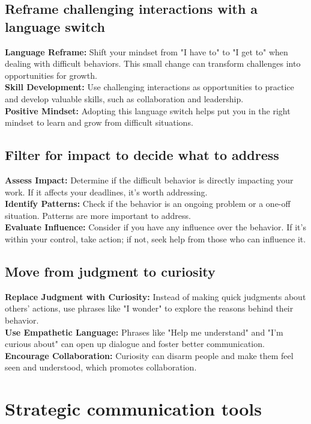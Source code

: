 \documentclass[12pt]{article}
\begin{document}
\subsection{Reframe challenging interactions with a language switch}
\textbf{Language Reframe:}  Shift your mindset from "I have to" to "I get to" when dealing with difficult behaviors. This small change can transform challenges into opportunities for growth.\\
\textbf{Skill Development:}  Use challenging interactions as opportunities to practice and develop valuable skills, such as collaboration and leadership.\\
\textbf{Positive Mindset:}  Adopting this language switch helps put you in the right mindset to learn and grow from difficult situations.

\subsection{Filter for impact to decide what to address}
\textbf{Assess Impact:}  Determine if the difficult behavior is directly impacting your work. If it affects your deadlines, it's worth addressing.\\
\textbf{Identify Patterns:}  Check if the behavior is an ongoing problem or a one-off situation. Patterns are more important to address.\\
\textbf{Evaluate Influence:}  Consider if you have any influence over the behavior. If it's within your control, take action; if not, seek help from those who can influence it.

\subsection{Move from judgment to curiosity}
\textbf{Replace Judgment with Curiosity:}  Instead of making quick judgments about others' actions, use phrases like "I wonder" to explore the reasons behind their behavior.\\
\textbf{Use Empathetic Language:} Phrases like "Help me understand" and "I'm curious about" can open up dialogue and foster better communication.\\
\textbf{Encourage Collaboration:} Curiosity can disarm people and make them feel seen and understood, which promotes collaboration.

\section{Strategic communication tools}
\end{document}
